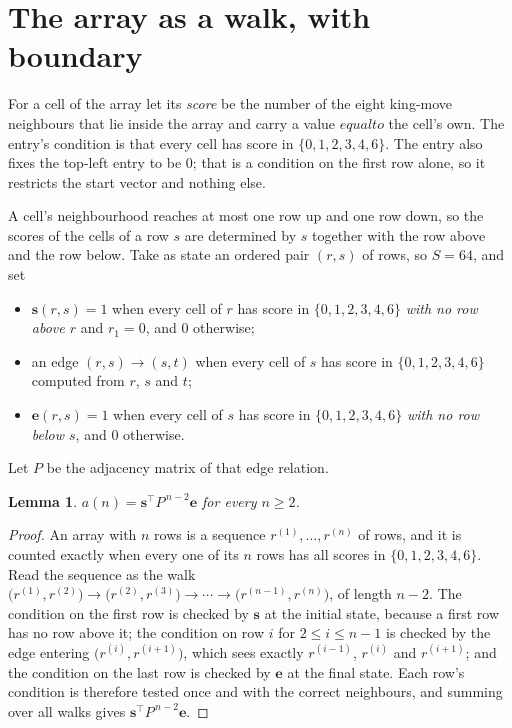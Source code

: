 \documentclass[11pt,a4paper]{article}
\theoremstyle{plain}
\newtheorem{lemma}[theorem]{Lemma}
\theoremstyle{definition}
\begin{document}
\section{The array as a walk, with boundary}

For a cell of the array let its \emph{score} be the number of the eight king-move neighbours that lie inside
the array and carry a value $equal to$ the cell's own. The entry's condition is that every cell
has score in $\{0,1,2,3,4,6\}$. The entry also fixes the top-left entry to be $0$; that is a condition on the first row alone, so it restricts the start vector and nothing else.

A cell's neighbourhood reaches at most one row up and one row down, so the scores of the
cells of a row $s$ are determined by $s$ together with the row above and the row below.
Take as state an ordered pair $(r,s)$ of rows, so $S=64$, and set
\begin{itemize}
\item $\mathbf{s}(r,s)=1$ when every cell of $r$ has score in $\{0,1,2,3,4,6\}$ \emph{with no row
above $r$} and $r_1=0$, and $0$ otherwise;
\item an edge $(r,s)\to(s,t)$ when every cell of $s$ has score in $\{0,1,2,3,4,6\}$ computed from
$r$, $s$ and $t$;
\item $\mathbf{e}(r,s)=1$ when every cell of $s$ has score in $\{0,1,2,3,4,6\}$ \emph{with no row
below $s$}, and $0$ otherwise.
\end{itemize}
Let $P$ be the adjacency matrix of that edge relation.

\begin{lemma}\label{lem:walk}
$a(n)=\mathbf{s}^{\!\top}P^{\,n-2}\mathbf{e}$ for every $n\ge2$.
\end{lemma}

\begin{proof}
An array with $n$ rows is a sequence $r^{(1)},\dots,r^{(n)}$ of rows, and it is counted
exactly when every one of its $n$ rows has all scores in $\{0,1,2,3,4,6\}$. Read the sequence as the
walk $\bigl(r^{(1)},r^{(2)}\bigr)\to\bigl(r^{(2)},r^{(3)}\bigr)\to\cdots\to
\bigl(r^{(n-1)},r^{(n)}\bigr)$, of length $n-2$. The condition on the first row is
checked by $\mathbf{s}$ at the initial state, because a first row has no row above it; the
condition on row $i$ for $2\le i\le n-1$ is checked by the edge entering
$\bigl(r^{(i)},r^{(i+1)}\bigr)$, which sees exactly $r^{(i-1)}$, $r^{(i)}$ and
$r^{(i+1)}$; and the condition on the last row is checked by $\mathbf{e}$ at the final
state. Each row's condition is therefore tested once and with the correct neighbours, and
summing over all walks gives $\mathbf{s}^{\!\top}P^{\,n-2}\mathbf{e}$.
\end{proof}
\end{document}
